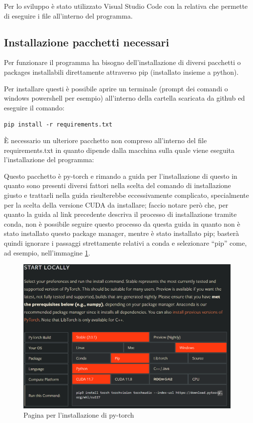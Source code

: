 Per lo sviluppo è stato utilizzato Visual Studio Code con la relativa \href{https://marketplace.visualstudio.com/items?itemName=ms-python.python}{} che permette di eseguire i file all’interno del programma.

\subsection{Installazione pacchetti necessari}
Per funzionare il programma ha bisogno dell’installazione di diversi pacchetti o packages installabili direttamente attraverso pip (installato insieme a python). 

Per installare questi è possibile aprire un terminale (prompt dei comandi o windows powershell per esempio) all’interno della cartella scaricata da github ed eseguire il comando:

\texttt{pip install -r requirements.txt}

È necessario un ulteriore pacchetto non compreso all’interno del file requirements.txt in quanto dipende dalla macchina sulla quale viene eseguita l’installazione del programma:

Questo pacchetto è py-torch e rimando a \href{https://learn.microsoft.com/it-it/windows/ai/windows-ml/tutorials/pytorch-analysis-installation}{} guida per l’installazione di questo in quanto sono presenti diversi fattori nella scelta del comando di installazione giusto e trattarli nella guida risulterebbe eccessivamente complicato, specialmente per la scelta della versione CUDA da installare; faccio notare però che, per quanto la guida al link precedente descriva il processo di installazione tramite conda, non è possibile seguire questo processo da questa guida in quanto non è stato installato questo package manager, mentre è stato installato pip; basterà quindi ignorare i passaggi strettamente relativi a conda e selezionare “pip” come, ad esempio, nell’immagine \ref{img:1}. 
\begin{figure}
    \begin{center}    
        \includegraphics[width=0.6\linewidth]{images/image1.png}
        \caption{Pagina per l'installazione di py-torch}
        \label{img:1}
    \end{center}
\end{figure}

